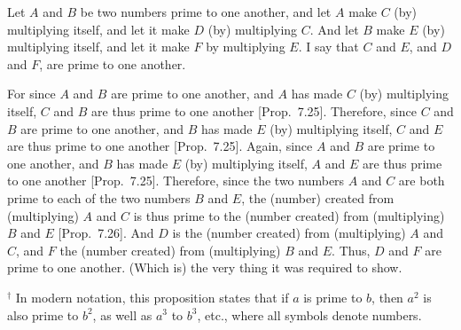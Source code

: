 \begin{Parallel}{}{}
{Let $A$ and $B$ be two numbers prime to one another, and let $A$ make
$C$ (by) multiplying itself, and let it make $D$ (by) multiplying $C$. 
And let $B$ make $E$ (by) multiplying itself, and let it make $F$ by multiplying $E$.
I say that $C$ and $E$, and $D$ and $F$, are prime to one another.

For since $A$ and $B$ are prime to one another, and $A$ has made $C$ (by)
multiplying itself, $C$ and $B$ are thus prime to one another [Prop.~7.25]. Therefore, since
$C$ and $B$ are prime to one another, and $B$ has made $E$ (by) multiplying itself,
$C$ and $E$ are thus prime to one another [Prop.~7.25].  Again, since $A$ and $B$ are prime to
one another, and $B$ has made $E$ (by) multiplying itself, $A$ and $E$ are thus
prime to one another [Prop.~7.25]. Therefore,
since the two numbers $A$ and $C$ are both prime to each of the two numbers
$B$ and $E$, the (number) created from (multiplying) $A$ and $C$ is thus
prime to the (number created) from (multiplying) $B$ and $E$ [Prop.~7.26]. And $D$ is the (number created)
from (multiplying) $A$ and $C$, and $F$ the (number created) from (multiplying)
$B$ and $E$. Thus, $D$ and $F$ are prime to one another. (Which is) the 
very thing it
was required to show.}
\end{Parallel}
{\footnotesize\noindent$^\dag$ In modern notation, this proposition
states that if $a$ is prime to $b$, then $a^2$ is also prime to $b^2$,
as well as $a^3$ to $b^3$, etc., where all symbols denote numbers.}

